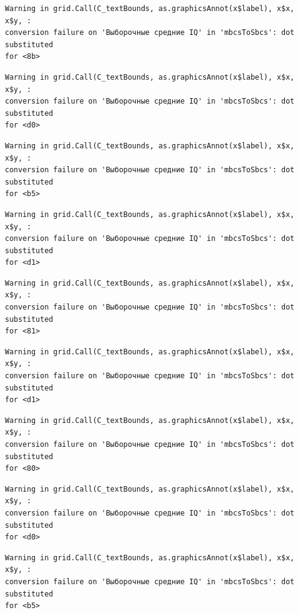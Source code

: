 \documentclass[
  letterpaper,
  DIV=11,
  numbers=noendperiod]{scrreprt}
\theoremstyle{definition}
\theoremstyle{remark}
\begin{document}
\begin{verbatim}
Warning in grid.Call(C_textBounds, as.graphicsAnnot(x$label), x$x, x$y, :
conversion failure on 'Выборочные средние IQ' in 'mbcsToSbcs': dot substituted
for <8b>
\end{verbatim}

\begin{verbatim}
Warning in grid.Call(C_textBounds, as.graphicsAnnot(x$label), x$x, x$y, :
conversion failure on 'Выборочные средние IQ' in 'mbcsToSbcs': dot substituted
for <d0>
\end{verbatim}

\begin{verbatim}
Warning in grid.Call(C_textBounds, as.graphicsAnnot(x$label), x$x, x$y, :
conversion failure on 'Выборочные средние IQ' in 'mbcsToSbcs': dot substituted
for <b5>
\end{verbatim}

\begin{verbatim}
Warning in grid.Call(C_textBounds, as.graphicsAnnot(x$label), x$x, x$y, :
conversion failure on 'Выборочные средние IQ' in 'mbcsToSbcs': dot substituted
for <d1>
\end{verbatim}

\begin{verbatim}
Warning in grid.Call(C_textBounds, as.graphicsAnnot(x$label), x$x, x$y, :
conversion failure on 'Выборочные средние IQ' in 'mbcsToSbcs': dot substituted
for <81>
\end{verbatim}

\begin{verbatim}
Warning in grid.Call(C_textBounds, as.graphicsAnnot(x$label), x$x, x$y, :
conversion failure on 'Выборочные средние IQ' in 'mbcsToSbcs': dot substituted
for <d1>
\end{verbatim}

\begin{verbatim}
Warning in grid.Call(C_textBounds, as.graphicsAnnot(x$label), x$x, x$y, :
conversion failure on 'Выборочные средние IQ' in 'mbcsToSbcs': dot substituted
for <80>
\end{verbatim}

\begin{verbatim}
Warning in grid.Call(C_textBounds, as.graphicsAnnot(x$label), x$x, x$y, :
conversion failure on 'Выборочные средние IQ' in 'mbcsToSbcs': dot substituted
for <d0>
\end{verbatim}

\begin{verbatim}
Warning in grid.Call(C_textBounds, as.graphicsAnnot(x$label), x$x, x$y, :
conversion failure on 'Выборочные средние IQ' in 'mbcsToSbcs': dot substituted
for <b5>
\end{verbatim}
\end{document}
